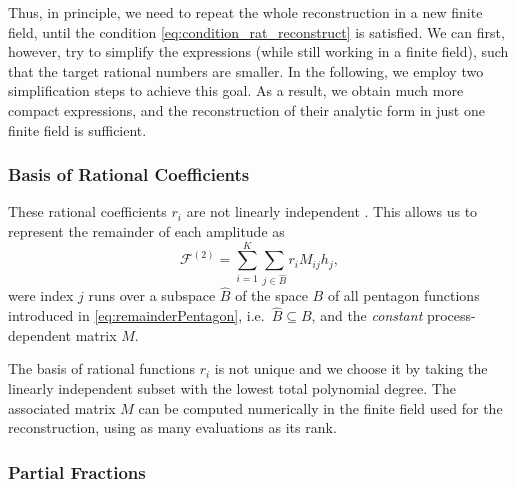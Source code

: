 Thus, in principle, we need to repeat the whole reconstruction in a new finite field, until the condition
\cref{eq:condition_rat_reconstruct} is satisfied.
We can first, however, try to simplify the expressions (while still working in a finite field),
such that the target rational numbers are smaller.
In the following, we employ two simplification steps to achieve this goal.
As a result, we obtain much more compact expressions,
and the reconstruction of their analytic form in just one finite field is sufficient. 

\subsubsection{Basis of Rational Coefficients}

These rational coefficients $r_i$ are not linearly independent \cite{Abreu:2018aqd,Chicherin:2018yne,Abreu:2019rpt,Chicherin:2019xeg}.
This allows us to represent the remainder of each amplitude as
\begin{equation} \label{eq:remainderDecomposition}
  \mathcal{F}^{(2)} = 
  \sum_{i=1}^K \sum_{j\in \hat B} r_i M_{ij} h_j,
\end{equation}
were index $j$ runs over a subspace $\hat B$ of the space $B$ of all pentagon functions 
introduced in \cref{eq:remainderPentagon}, i.e.\  $\hat B\subseteq B$,
and the \emph{constant} process-dependent matrix $M$.

The basis of rational functions $r_i$ is not unique
and we choose it by taking the linearly independent subset with
the lowest total polynomial degree. The associated matrix $M$
can be computed numerically in the finite field used for the reconstruction,
using as many evaluations as its rank. 



\subsubsection{Partial Fractions}

